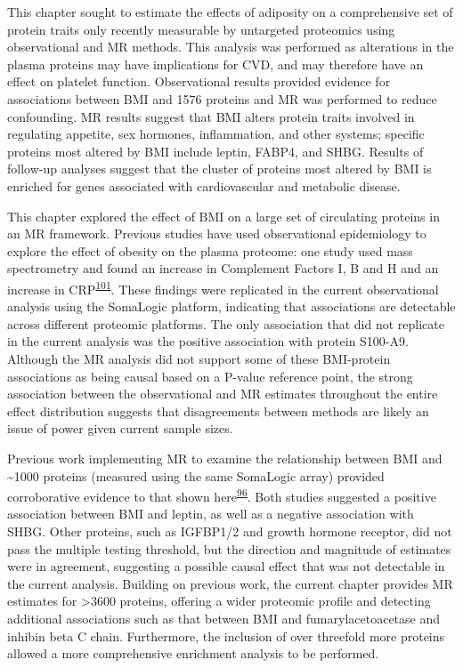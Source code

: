 \documentclass[11pt,twoside]{bristolthesis}
\begin{document}
This chapter sought to estimate the effects of adiposity on a comprehensive set of protein traits only recently measurable by untargeted proteomics using observational and MR methods. This analysis was performed as alterations in the plasma proteins may have implications for CVD, and may therefore have an effect on platelet function. Observational results provided evidence for associations between BMI and 1576 proteins and MR was performed to reduce confounding. MR results suggest that BMI alters protein traits involved in regulating appetite, sex hormones, inflammation, and other systems; specific proteins most altered by BMI include leptin, FABP4, and SHBG. Results of follow-up analyses suggest that the cluster of proteins most altered by BMI is enriched for genes associated with cardiovascular and metabolic disease.

This chapter explored the effect of BMI on a large set of circulating proteins in an MR framework. Previous studies have used observational epidemiology to explore the effect of obesity on the plasma proteome: one study used mass spectrometry and found an increase in Complement Factors I, B and H and an increase in CRP\textsuperscript{\protect\hyperlink{ref-Cominetti2018}{101}}. These findings were replicated in the current observational analysis using the SomaLogic platform, indicating that associations are detectable across different proteomic platforms. The only association that did not replicate in the current analysis was the positive association with protein S100-A9. Although the MR analysis did not support some of these BMI-protein associations as being causal based on a P-value reference point, the strong association between the observational and MR estimates throughout the entire effect distribution suggests that disagreements between methods are likely an issue of power given current sample sizes.

Previous work implementing MR to examine the relationship between BMI and \textasciitilde1000 proteins (measured using the same SomaLogic array) provided corroborative evidence to that shown here\textsuperscript{\protect\hyperlink{ref-Zaghlool2021}{96}}. Both studies suggested a positive association between BMI and leptin, as well as a negative association with SHBG. Other proteins, such as IGFBP1/2 and growth hormone receptor, did not pass the multiple testing threshold, but the direction and magnitude of estimates were in agreement, suggesting a possible causal effect that was not detectable in the current analysis. Building on previous work, the current chapter provides MR estimates for \textgreater3600 proteins, offering a wider proteomic profile and detecting additional associations such as that between BMI and fumarylacetoacetase and inhibin beta C chain. Furthermore, the inclusion of over threefold more proteins allowed a more comprehensive enrichment analysis to be performed.
\end{document}
